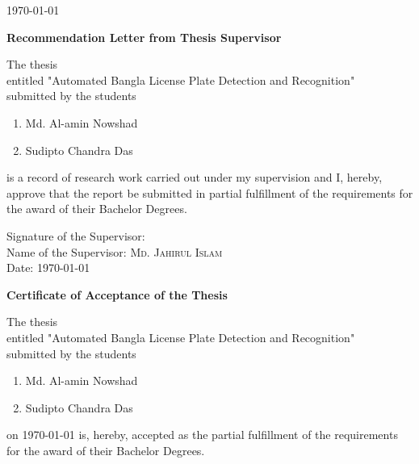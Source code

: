 \documentclass{standalone}
\begin{document}
\begin{titlepage}
\begin{center}
    \vfill
    \today
    
\end{center}

\newpage

\begin{center}
	\textbf{\huge Recommendation Letter from Thesis Supervisor}
\end{center}
	
    \vspace{0.5cm}
    
    \noindent
	The thesis\\
    entitled "{Automated Bangla License Plate Detection and Recognition}"\\
    submitted by the students
	\begin{enumerate}
		\item Md. Al-amin Nowshad
		\item Sudipto Chandra Das
	\end{enumerate}
	is a record of research work carried out under my supervision and I, hereby, approve that the report be submitted in partial fulfillment of the requirements for the award of their Bachelor Degrees.\\
	
    \vspace{4.0cm}
	
    \noindent
	Signature of the Supervisor: \\
	Name of the Supervisor: \textsc{\large Md. Jahirul Islam}\\%
	Date: \today
				
\newpage

\begin{center}
	\textbf{\huge Certificate of Acceptance of the Thesis} \\
\end{center}
	
    \vspace{0.5cm}
    
	\noindent
	The thesis\\
	entitled "{Automated Bangla License Plate Detection and Recognition}"\\
	submitted by the students
	\begin{enumerate}
		\item Md. Al-amin Nowshad
		\item Sudipto Chandra Das
	\end{enumerate}	
    on \today
    \noindent
	is, hereby, accepted as the partial fulfillment of the requirements for the award of their Bachelor Degrees.
				

\end{titlepage}
\end{document}
